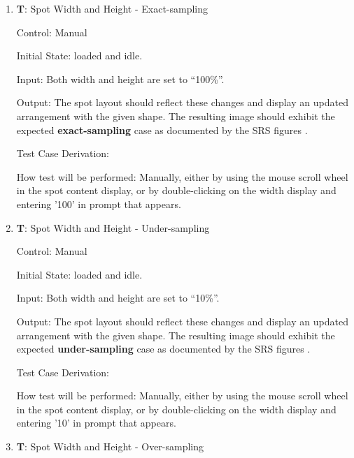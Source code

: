 \documentclass[12pt, titlepage]{article}
\newcounter{testnum} %
\begin{document}
\begin{enumerate}

  \item{\textbf{T\thetestnum \label{T_spotSize}}: Spot Width and Height - Exact-sampling\\}

    Control: Manual
              
    Initial State: \progname{} loaded and idle.
              
    Input: Both width and height are set to ``100\%''.
              
    Output: The spot layout should reflect these changes and display an updated arrangement with the given shape.
    The resulting image should exhibit the expected \textbf{exact-sampling} case as documented by the SRS figures \citep{SRS}.

    Test Case Derivation: 
              
    How test will be performed: Manually, either by using the mouse scroll wheel in
      the spot content display, or by double-clicking on the width display and entering '100'
      in prompt that appears.
					
    \item{\textbf{T\thetestnum \label{T_spotSize10}}: Spot Width and Height - Under-sampling\\}

    Control: Manual
              
    Initial State: \progname{} loaded and idle.
              
    Input: Both width and height are set to ``10\%''.
              
    Output: The spot layout should reflect these changes and display an updated arrangement with the given shape.
    The resulting image should exhibit the expected \textbf{under-sampling} case as documented by the SRS figures \citep{SRS}.

    Test Case Derivation: 
              
    How test will be performed: Manually, either by using the mouse scroll wheel in
      the spot content display, or by double-clicking on the width display and entering '10'
      in prompt that appears.
					
    \item{\textbf{T\thetestnum \label{T_spotSize500}}: Spot Width and Height - Over-sampling\\}


\end{enumerate}
\end{document}
